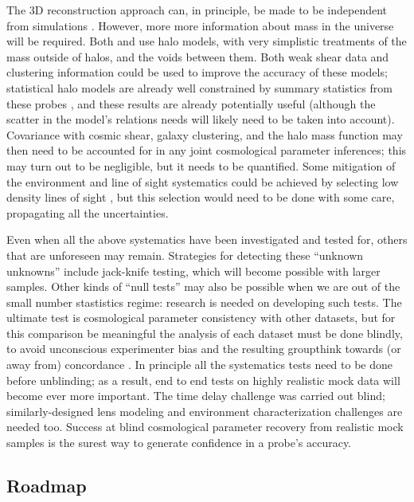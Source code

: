 The 3D reconstruction approach can, in principle, be made to be
independent from simulations \citep[indeed, this was a design feature
of][]{McCullyEtal2014}.  However, more  more information about mass in
the universe will be required.  Both \citet{McCullyEtal2014} and
\citet{CollettEtal2013} use halo models, with very simplistic treatments
of the mass outside of halos, and the voids between them. Both weak
shear data and clustering information could be used to improve the
accuracy of these  models; statistical halo models are already well
constrained by summary statistics from these probes
\citep[e.g.][]{CouponEtal2015},  and these results are already
potentially useful (although the scatter in the model's relations needs
will likely need to be taken into account).  Covariance with cosmic
shear, galaxy clustering, and the halo mass function may then  need to
be accounted for in any joint cosmological parameter inferences; this
may turn out to be negligible, but it needs to be quantified.  Some
mitigation of the environment and line of sight systematics could be
achieved by selecting low density lines of sight
\citep{CollettEtal2013}, but this selection would need to be done with
some care, propagating all the uncertainties.


Even when all the above systematics have been investigated and tested
for, others that are unforeseen may remain. Strategies for detecting
these ``unknown unknowns'' include jack-knife testing, which  will
become possible with larger samples. Other kinds of ``null tests'' may
also be possible when we are out of the small number stastistics regime:
research is needed on developing such tests. The ultimate test is
cosmological parameter consistency with other datasets, but for this
comparison be meaningful the analysis of each dataset must be done
blindly, to avoid unconscious experimenter bias and the resulting
groupthink towards (or away from) concordance
\citep[see e.g.][]{Con++06,Suy++13}. In principle all the
systematics tests  need to be done before unblinding; as a result, end
to end tests on highly realistic mock data will become ever more
important. The time delay challenge was carried out blind;
similarly-designed lens modeling and environment characterization
challenges are needed too. Success at blind cosmological parameter
recovery from realistic mock samples is the surest way to generate
confidence in a probe's accuracy.



\subsection{Roadmap}
\label{ssec:roadmap}


